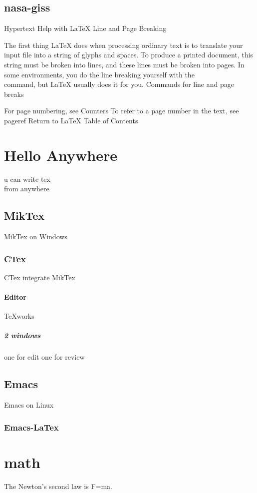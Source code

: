 \documentclass[a4paper,11pt]{book} %
\begin{document}
\subsection{nasa-giss}
Hypertext Help with LaTeX
Line and Page Breaking

The first thing LaTeX does when processing ordinary text is to translate your input file into a string of glyphs and spaces. To produce a printed document, this string must be broken into lines, and these lines must be broken into pages. In some environments, you do the line breaking yourself with the \\ command, but LaTeX usually does it for you.
Commands for line and page breaks
%
%

For page numbering, see Counters
To refer to a page number in the text, see \newline pageref
Return to LaTeX Table of Contents

\section{Hello Anywhere} u can write tex\\ from anywhere
		\subsection{MikTex} MikTex on
Windows
			\subsubsection{CTex}CTex integrate MikTex
				\paragraph{Editor}TeXworks
					\subparagraph{2 windows}one for edit one for review
		\subsection{Emacs}Emacs on Linux
			\subsubsection{Emacs-LaTex}

	\section{math}The Newton's second law is F=ma. %
\end{document}
